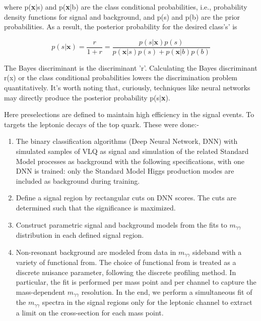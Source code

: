 where  p(\textbf{x}|s) and p(\textbf{x}|b) are the class conditional probabilities, i.e., probability density functions for signal and background, and p(s) and p(b) are the prior probabilities.
 As a result, the posterior probability for the desired class's' is
 
\begin{equation}
    p(s|\textbf{x}) = \frac{r}{1+r} = \frac{ p(s|\textbf{x}) p(s)}{p(\textbf{x}|s)p(s) +  p(\textbf{x}|b)p(b)}
\end{equation}

The Bayes discriminant is the discriminant 'r'. Calculating the Bayes discriminant r(x) or the class conditional probabilities lowers the discrimination problem quantitatively. It's worth noting that, curiously, techniques like neural networks may directly produce the posterior probability p(s|\textbf{x}).



Here preselections are defined to maintain high efficiency in the signal events. To targets the leptonic decays of the top quark. These were done:-
\begin{enumerate}
    \item The binary classification algorithms (Deep Neural Network, DNN) with simulated samples of VLQ as signal and simulation of the related Standard Model processes as background with the following specifications, with one DNN is trained: only the Standard Model Higgs production modes are included as background during training.

\item Define a signal region by rectangular cuts on DNN scores. The cuts are determined such that the significance is maximized.

\item Construct parametric signal and background models from the fits to $m_{\gamma\gamma}$ distribution in each defined signal region. 
\item Non-resonant background are modeled from data in $m_{\gamma\gamma}$  sideband with a variety of functional from. The choice of functional from is treated as a discrete nuisance parameter, following the discrete profiling method. In particular, the fit is performed per mass point and per channel to capture the mass-dependent $m_{\gamma\gamma}$ resolution. In the end, we perform a simultaneous fit of the $m_{\gamma\gamma}$  spectra in the signal regions only for the leptonic channel to extract a limit on the cross-section for each mass point.
\end{enumerate}


